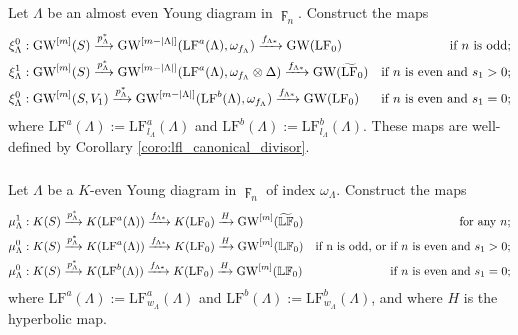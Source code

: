 \documentclass[a4paper]{amsart}
\theoremstyle{plain}
\theoremstyle{definition}
\numberwithin{equation}{section}
\newcommand{\GW}{\mathrm{GW}}
\newcommand{\LF}{\mathrm{LF}}
\newcommand{\LFb}{\mathbb{LF}}
\begin{document}
\subsubsection{ }
Let $\Lambda$ be an almost even Young diagram in $\digamma_{n}$. Construct the maps
\[\begin{aligned}
         & \xi_\Lambda^0: \GW^{[m]}(S) \xrightarrow{p_\Lambda^*} \GW^{[m-|\Lambda|]}(\LF^a({\Lambda}), \omega_{f_\Lambda}) \xrightarrow{f_{\Lambda * }} \GW(\LF_0)                           & \textnormal{if $n$ is odd;}                \\
         & \xi_\Lambda^1: \GW^{[m]}(S) \xrightarrow{p_\Lambda^*} \GW^{[m-|\Lambda|]}(\LF^a({\Lambda}), \omega_{f_\Lambda}\otimes \Delta) \xrightarrow{f_{\Lambda * }} \GW(\widetilde{\LF}_0) & \textnormal{if $n$ is even and $s_1 > 0$;} \\
         & \xi_\Lambda^0: \GW^{[m]}(S, V_1) \xrightarrow{p_\Lambda^*}  \GW^{[m-|\Lambda|]}(\LF^b{(\Lambda)}, \omega_{f_\Lambda}) \xrightarrow{f_{\Lambda * }} \GW(\LF_0)                     & \textnormal{if $n$ is even and $s_1 = 0$;}
    \end{aligned}\]
where $\LF^a(\Lambda) := \LF^a_{l_\Lambda}(\Lambda) $ and $\LF^b(\Lambda):= \LF^b_{l_\Lambda}(\Lambda) $. These maps are well-defined by Corollary \ref{coro:lfl_canonical_divisor}.
\subsubsection{ }
Let $\Lambda$ be a $K$-even Young diagram in $\digamma_{n}$ of index $\omega_\Lambda$. Construct the maps
\[\begin{aligned}
         & \mu_\Lambda^1: K(S) \xrightarrow{p_\Lambda^*} K(\mathrm{L}{\mathrm{F}}^a{(\Lambda)}) \xrightarrow{f_{\Lambda*}} K(\LF_0) \xrightarrow{ H} \GW^{[m]}(\widetilde{\LFb}_0) & \textnormal{for any $n$;}                                  \\
         & \mu_\Lambda^0: K(S) \xrightarrow{p_\Lambda^*} K(\LF^a{(\Lambda)}) \xrightarrow{f_{\Lambda*}} K(\LF_0) \xrightarrow{ H} \GW^{[m]}({\LFb}_0)                              & \textnormal{if n is odd, or if $n$ is even and $s_1 > 0$;} \\
         & \mu_\Lambda^0: K(S) \xrightarrow{p_\Lambda^*} K(\LF^b{(\Lambda)}) \xrightarrow{f_{\Lambda*}} K(\LF_0) \xrightarrow{ H} \GW^{[m]}({\LFb}_0)                              & \textnormal{if $n$ is even and $s_1 = 0$;}
    \end{aligned}\]
where $\LF^a(\Lambda) := \LF^a_{w_\Lambda}(\Lambda) $ and $\LF^b(\Lambda) := \LF^b_{w_\Lambda}(\Lambda)$, and where $H$ is the hyperbolic map.
\end{document}
